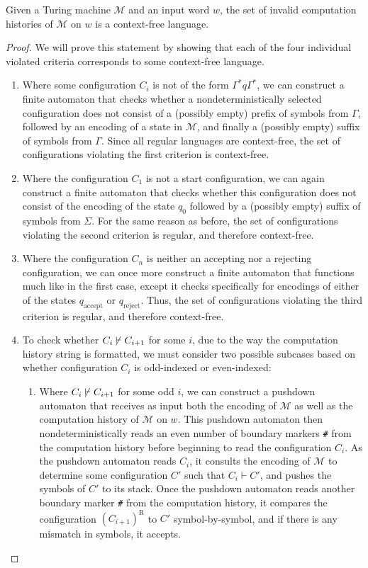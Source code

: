 \begin{lemma}\label{lem:invalidcomputationhistoryCFL}
Given a Turing machine $\mathcal{M}$ and an input word $w$, the set of invalid computation histories of $\mathcal{M}$ on $w$ is a context-free language.

\begin{proof}
We will prove this statement by showing that each of the four individual violated criteria corresponds to some context-free language.
\begin{enumerate}
\item Where some configuration $C_{i}$ is not of the form $\Gamma^{*} q \Gamma^{*}$, we can construct a finite automaton that checks whether a nondeterministically selected configuration does not consist of a (possibly empty) prefix of symbols from $\Gamma$, followed by an encoding of a state in $\mathcal{M}$, and finally a (possibly empty) suffix of symbols from $\Gamma$. Since all regular languages are context-free, the set of configurations violating the first criterion is context-free.

\item Where the configuration $C_{1}$ is not a start configuration, we can again construct a finite automaton that checks whether this configuration does not consist of the encoding of the state $q_{0}$ followed by a (possibly empty) suffix of symbols from $\Sigma$. For the same reason as before, the set of configurations violating the second criterion is regular, and therefore context-free.

\item Where the configuration $C_{n}$ is neither an accepting nor a rejecting configuration, we can once more construct a finite automaton that functions much like in the first case, except it checks specifically for encodings of either of the states $q_{\text{accept}}$ or $q_{\text{reject}}$. Thus, the set of configurations violating the third criterion is regular, and therefore context-free.

\item To check whether $C_{i} \mkern-2mu\not\mkern2mu\vdash C_{i+1}$ for some $i$, due to the way the computation history string is formatted, we must consider two possible subcases based on whether configuration $C_{i}$ is odd-indexed or even-indexed:
	\begin{enumerate}
	\item Where $C_{i} \mkern-2mu\not\mkern2mu\vdash C_{i+1}$ for some odd $i$, we can construct a pushdown automaton that receives as input both the encoding of $\mathcal{M}$ as well as the computation history of $\mathcal{M}$ on $w$. This pushdown automaton then nondeterministically reads an even number of boundary markers \texttt{\#} from the computation history before beginning to read the configuration $C_{i}$. As the pushdown automaton reads $C_{i}$, it consults the encoding of $\mathcal{M}$ to determine some configuration $C'$ such that $C_{i} \vdash C'$, and pushes the symbols of $C'$ to its stack. Once the pushdown automaton reads another boundary marker \texttt{\#} from the computation history, it compares the configuration $(C_{i+1})^{\text{R}}$ to $C'$ symbol-by-symbol, and if there is any mismatch in symbols, it accepts.
	

\end{enumerate}
\end{enumerate}
\end{proof}
\end{lemma}

